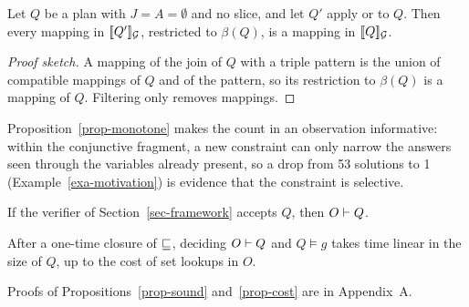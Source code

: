 \begin{proposition}
\label{prop-monotone}
Let $Q$ be a plan with $J = A = \emptyset$ and no slice, and let
$Q'$ apply  or  to $Q$.
Then every mapping in $[\![ Q' ]\!]_{\mathcal{G}}$, restricted to $\beta(Q)$, is
a mapping in $[\![ Q ]\!]_{\mathcal{G}}$.
\end{proposition}

\begin{proof}[Proof sketch]
A mapping of the join of $Q$ with a triple pattern is the union of
compatible mappings of $Q$ and of the pattern, so its restriction to
$\beta(Q)$ is a mapping of $Q$.
Filtering only removes mappings.
\end{proof}

Proposition~\ref{prop-monotone} makes the count in an observation
informative: within the conjunctive fragment, a new constraint can only
narrow the answers seen through the variables already present, so a
drop from 53 solutions to 1 (Example~\ref{exa-motivation}) is evidence
that the constraint is selective.

\begin{proposition}
\label{prop-sound}
If the verifier of Section~\ref{sec-framework} accepts $Q$, then
$O \vdash Q$.
\end{proposition}

\begin{proposition}
\label{prop-cost}
After a one-time closure of $\sqsubseteq$, deciding $O \vdash Q$ and
$Q \models g$ takes time linear in the size of $Q$, up to the
cost of set lookups in $O$.
\end{proposition}

Proofs of Propositions~\ref{prop-sound} and~\ref{prop-cost} are in
Appendix~A.
